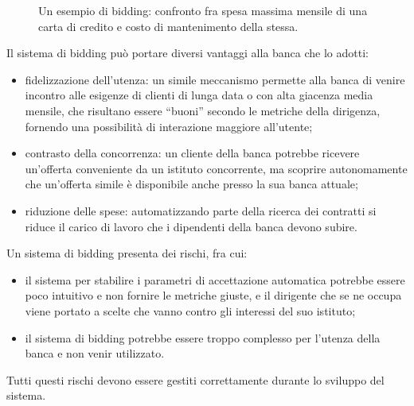 \begin{figure}
	\caption{Un esempio di bidding: confronto fra spesa massima mensile di una carta di credito e costo di mantenimento della stessa.}
	\label{fig:bidding}
\end{figure}

Il sistema di bidding pu\`o portare diversi vantaggi alla banca che lo adotti:
\begin{itemize}
	\item fidelizzazione dell'utenza: un simile meccanismo permette alla banca di venire incontro alle esigenze di clienti di lunga data o con alta giacenza media mensile, che risultano essere ``buoni'' secondo le metriche della dirigenza, fornendo una possibilit\`a di interazione maggiore all'utente;
	\item contrasto della concorrenza: un cliente della banca potrebbe ricevere un'offerta conveniente da un istituto concorrente, ma scoprire autonomamente che un'offerta simile \`e disponibile anche presso la sua banca attuale;
	\item riduzione delle spese: automatizzando parte della ricerca dei contratti si riduce il carico di lavoro che i dipendenti della banca devono subire.
\end{itemize}

Un sistema di bidding presenta dei rischi, fra cui:
\begin{itemize}
	\item il sistema per stabilire i parametri di accettazione automatica potrebbe essere poco intuitivo e non fornire le metriche giuste, e il dirigente che se ne occupa viene portato a scelte che vanno contro gli interessi del suo istituto;
	\item il sistema di bidding potrebbe essere troppo complesso per l'utenza della banca e non venir utilizzato.
\end{itemize}
Tutti questi rischi devono essere gestiti correttamente durante lo sviluppo del sistema.

